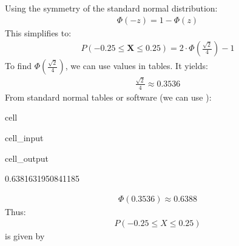 \documentclass[letterpaper,10pt,english]{jupyterBook}
\begin{document}
\sphinxAtStartPar
Using the symmetry of the standard normal distribution:
\begin{equation*}
\begin{split}\Phi(-z) = 1 - \Phi(z)\end{split}
\end{equation*}
\sphinxAtStartPar
This simplifies to:
\begin{equation*}
\begin{split}P(-0.25 \leq \mathbf X \leq 0.25) = 2 \cdot \Phi\left(\frac{\sqrt{2}}{4}\right) - 1\end{split}
\end{equation*}
\sphinxAtStartPar
To find \(\Phi\left(\frac{\sqrt{2}}{4}\right)\), we can use values in tables. It yields:
\begin{equation*}
\begin{split}\frac{\sqrt{2}}{4} \approx 0.3536\end{split}
\end{equation*}
\sphinxAtStartPar
From standard normal tables or software (we can use ):

\begin{sphinxuseclass}{cell}\begin{sphinxVerbatimInput}

\begin{sphinxuseclass}{cell_input}
\begin{sphinxVerbatim}[commandchars=\\\{\}]
\end{sphinxVerbatim}

\end{sphinxuseclass}\end{sphinxVerbatimInput}
\begin{sphinxVerbatimOutput}

\begin{sphinxuseclass}{cell_output}
\begin{sphinxVerbatim}[commandchars=\\\{\}]
0.6381631950841185
\end{sphinxVerbatim}

\end{sphinxuseclass}\end{sphinxVerbatimOutput}

\end{sphinxuseclass}\begin{equation*}
\begin{split}\Phi(0.3536) \approx 0.6388\end{split}
\end{equation*}
\sphinxAtStartPar
Thus:
\begin{equation*}
\begin{split}P(-0.25 \leq X \leq 0.25)\end{split}
\end{equation*}
\sphinxAtStartPar
is given by
\end{document}
